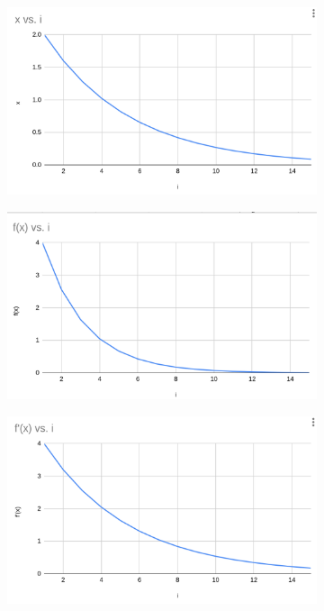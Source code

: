 \documentclass{article}
\begin{document}
\begin{figure}[H]
    \centering
    
    \begin{subfigure}{0.3\linewidth}
        \centering
        \includegraphics[width=\textwidth]{x.png}
        \label{fig:enter-label}
    \end{subfigure}

    \begin{subfigure}{0.3\textwidth}
        \centering
        \includegraphics[width=\textwidth]{fx.png}
        \label{fig:enter-label}
    \end{subfigure}
    
    \begin{subfigure}{0.3\linewidth}
        \centering
        \includegraphics[width=\linewidth]{f_prime.png}
        \label{fig:enter-label}
    \end{subfigure}
    

\end{figure}
\end{document}
